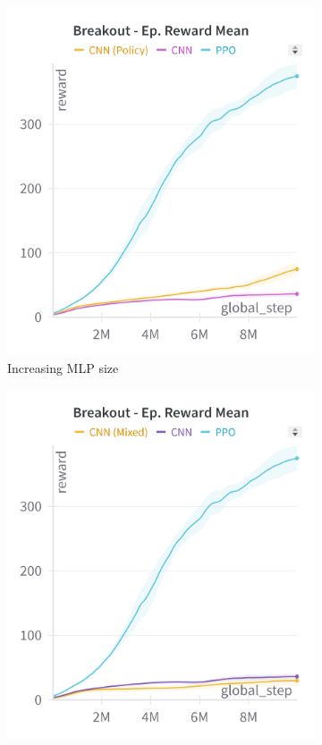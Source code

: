 \begin{figure}[ht]
    \centering
    \begin{subfigure}[b]{0.32\textwidth}
        \centering
        \includegraphics[width=\textwidth]{images/breakout_cnn_policy}
        \caption{Increasing MLP size}
        \label{fig:breakout_cnn_policy}
    \end{subfigure}
    \hfill
    \begin{subfigure}[b]{0.32\textwidth}
        \centering
        \includegraphics[width=\textwidth]{images/breakout_cnn_mixed}

\end{subfigure}
\end{figure}
